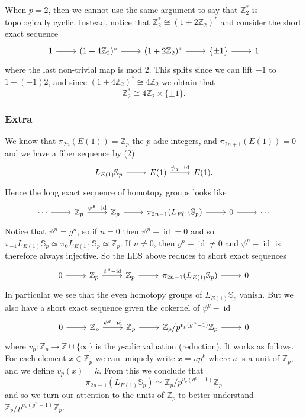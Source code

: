 \documentclass[a4paper]{article} %
\theoremstyle{definition}
\newcommand{\Z}{\mathbb{Z}}
\newcommand{\Sph}{\mathbb{S}}
\begin{document}
When $p=2$, then we cannot use the same argument to say that $\Z_2^*$ is topologically cyclic. Instead, notice that $\Z_2^* \cong (1 + 2\Z_2)^*$ and consider the short exact sequence
\[
\begin{tikzcd}
  1 \arrow{r} & (1 + 4\Z_2)^* \arrow{r} & (1+2\Z_2)^* \arrow{r} & \{\pm 1\} \rar & 1
\end{tikzcd}
\]
where the last non-trivial map is mod $2$. This splits since we can lift $-1$ to $1 + (-1)2$, and since $(1 + 4\Z_2)^* \cong 4\Z_2$ we obtain that
\[
\Z_2^* \cong 4\Z_2 \times \{\pm 1\}.
\]

\subsubsection{Extra}

We know  that $\pi_{2n}(E(1)) = \Z_p$ the $p$-adic integers, and $\pi_{2n+1}(E(1)) = 0$ and we have a fiber sequence by (2)
\[
\begin{tikzcd}
L_{E(1)} \Sph_p \rar & E(1) \rar{\psi_g - \operatorname{id}} & E(1).
\end{tikzcd}
\]
Hence the long exact sequence of homotopy groups looks like
\[
\begin{tikzcd}
\cdots \rar & \Z_p \rar{\psi^g - \operatorname{id}} & \Z_p \rar{} & \pi_{2n-1}(L_{E(1)}\Sph_p) \rar & 0 \rar & \cdots
\end{tikzcd}
\]
Notice that $\psi^n = g^n$, so if $n=0$ then $\psi^n - \operatorname{id} = 0$ and so $\pi_{-1}L_{E(1)}\Sph_p \simeq \pi_{0}L_{E(1)}\Sph_p \simeq \Z_p$. If $n \neq 0$, then $g^n - \operatorname{id} \neq 0$ and $\psi^n - \operatorname{id}$ is therefore always injective. So the LES above reduces to short exact sequences
\[
\begin{tikzcd}
0 \rar & \Z_p \rar{\psi^g - \operatorname{id}} & \Z_p \rar{} & \pi_{2n-1}(L_{E(1)}\Sph_p) \rar & 0
\end{tikzcd}
\]
In particular we see that the even homotopy groups of $L_{E(1)}\Sph_p$ vanish. But we also have a short exact sequence given the cokernel of $\psi^g-\operatorname{id}$
\[
\begin{tikzcd}
0 \rar & \Z_p \rar{\psi^g - \operatorname{id}} & \Z_p \rar{} & \Z_p/{p^{v_p(g^n-1)}\Z_p} \rar & 0
\end{tikzcd}
\]
where $v_p \colon \Z_p \to \Z \cup \{\infty\}$ is the $p$-adic valuation (reduction). It works as follows. For each element $x \in \Z_p$ we can uniquely write $x=up^k$ where $u$ is a unit of $\Z_p$, and we define $v_p(x) = k$. From this we conclude that
\[
\pi_{2n-1}(L_{E(1)}\Sph_p) \simeq \Z_p/{p^{v_p(g^n-1)}\Z_p}
\]
and so we turn our attention to the units of $\Z_p$ to better understand $\Z_p/{p^{v_p(g^n-1)}\Z_p}$. 
\end{document}

